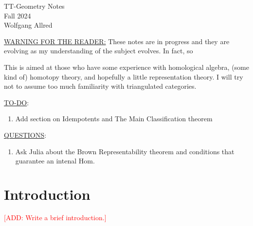 \documentclass[11pt]{article}
\begin{document}
\begin{centering}
\Large{TT-Geometry Notes}\\

\normalsize{Fall 2024 \\ Wolfgang Allred}

\end{centering}
\bigskip

\noindent

\large{\underline{WARNING FOR THE READER:}} \normalsize These notes are in progress and they are evolving as my understanding of the subject evolves. In fact, so

This is aimed at those who have some experience with homological algebra, (some kind of) homotopy theory, and hopefully a little representation theory. I will try not to assume too much familiarity with triangulated categories.

\large{\underline{TO-DO}:}\normalsize
\begin{enumerate}[$\bullet$]
	\item Add section on Idempotents and The Main Classification theorem
\end{enumerate}


\large{\underline{QUESTIONS}:}\normalsize
\begin{enumerate}[$\bullet$]
	\item Ask Julia about the Brown Representability theorem and conditions that guarantee an intenal Hom.
\end{enumerate}

\newpage
\tableofcontents

\section{Introduction}

\large{\textcolor{red}{[ADD: Write a brief introduction.]}} \normalsize
\end{document}
